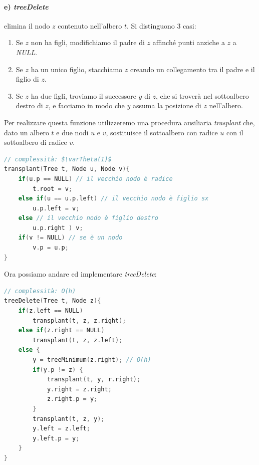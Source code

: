 \documentclass[italian]{article}
\begin{document}
\paragraph{e) \textit{treeDelete}} elimina il nodo $z$ contenuto nell'albero $t$. Si distinguono 3 casi:
\begin{enumerate}[itemsep=0pt,label=\arabic*)]
	\item Se $z$ non ha figli, modifichiamo il padre di $z$ affinché punti anziche a $z$ a \textit{NULL}.
	\item Se $z$ ha un unico figlio, stacchiamo $z$ creando un collegamento tra il padre e il figlio di $z$.
	\item Se $z$ ha due figli, troviamo il successore $y$ di $z$, che si troverà nel sottoalbero destro di $z$, e facciamo in modo che $y$ assuma la posizione di $z$ nell'albero.
\end{enumerate}
Per realizzare questa funzione utilizzeremo una procedura ausiliaria \textit{trasplant} che, dato un albero $t$ e due nodi $u$ e $v$, sostituisce il sottoalbero con radice $u$ con il sottoalbero di radice $v$.
\begin{lstlisting}[language=c,mathescape=true]
// complessità: $\varTheta(1)$
transplant(Tree t, Node u, Node v){
	if(u.p == NULL) // il vecchio nodo è radice
		t.root = v; 
	else if(u == u.p.left) // il vecchio nodo è figlio sx
		u.p.left = v;
	else // il vecchio nodo è figlio destro
		u.p.right ) v;
	if(v != NULL) // se è un nodo
		v.p = u.p;
}
\end{lstlisting}
Ora possiamo andare ed implementare \textit{treeDelete}:
\begin{lstlisting}[language=c,mathescape=true]
// complessità: O(h)
treeDelete(Tree t, Node z){
	if(z.left == NULL)
		transplant(t, z, z.right);
	else if(z.right == NULL)
		transplant(t, z, z.left);
	else {
		y = treeMinimum(z.right); // O(h)
		if(y.p != z) {
			transplant(t, y, r.right);
			y.right = z.right;
			z.right.p = y;
		}
		transplant(t, z, y);
		y.left = z.left;
		y.left.p = y;
	}
}
\end{lstlisting}
\pagebreak
\end{document}
